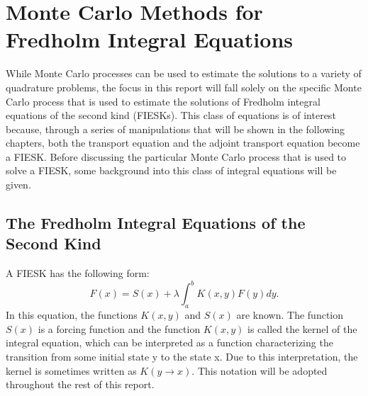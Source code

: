 \chapter{Monte Carlo Methods for Fredholm Integral Equations}
\label{ch:mc_methods}
While Monte Carlo processes can be used to estimate the solutions to a variety 
of quadrature problems, the focus in this report will fall solely on the 
specific Monte Carlo process that is used to estimate the solutions of Fredholm 
integral equations of the second kind (FIESKs). This class of equations is of 
interest because, through a series of manipulations that will be shown in the 
following chapters, both the transport equation and the adjoint transport 
equation become a FIESK. Before discussing the particular Monte Carlo process 
that is used to solve a FIESK, some background into this class of integral 
equations will be given. 

\section{The Fredholm Integral Equations of the Second Kind}
\label{sec:integral_equations}
A FIESK has the following form:
\begin{equation}
  F(x) = S(x) + \lambda \int_a^b K(x,y) F(y)dy.
  \label{eq:fredholm_int_eqn}
\end{equation}
In this equation, the functions $K(x,y)$ and $S(x)$ are known. The 
function $S(x)$ is a forcing function and the function $K(x,y)$ is called the 
kernel of the integral equation, which can be interpreted as a function 
characterizing the transition from some initial state y to the state x. Due to 
this interpretation, the kernel is sometimes written as $K(y \to x)$. This 
notation will be adopted throughout the rest of this report.

